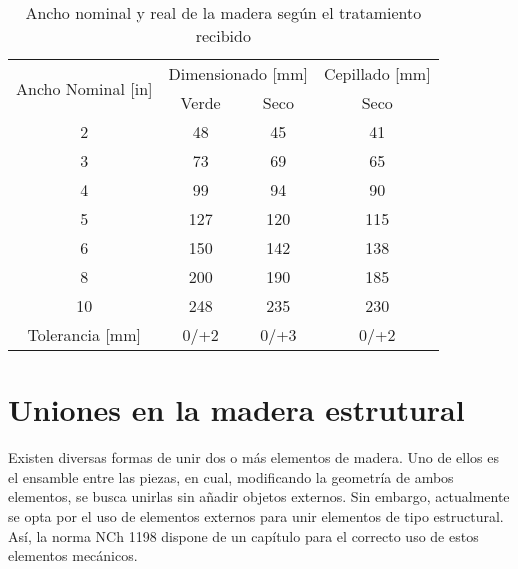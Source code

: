 \begin{table}[H]
\centering
\begin{tabular}{@{}cccc@{}}
\toprule
\multirow{2}{*}{Ancho Nominal {[}in{]}} & \multicolumn{2}{c}{Dimensionado {[}mm{]}} & Cepillado {[}mm{]} \\ \cmidrule(l){2-4} 
                                        & Verde                & Seco               & Seco               \\ \midrule
2                                       & 48                   & 45                 & 41                 \\
3                                       & 73                   & 69                 & 65                 \\
4                                       & 99                   & 94                 & 90                 \\
5                                       & 127                  & 120                & 115                \\
6                                       & 150                  & 142                & 138                \\
8                                       & 200                  & 190                & 185                \\
10                                      & 248                  & 235                & 230                \\ \midrule
Tolerancia {[}mm{]}                     & 0/+2                 & 0/+3               & 0/+2               \\ \bottomrule
\end{tabular}
\caption{Ancho nominal y real de la madera según el tratamiento recibido}
\label{tab:anchodim}
\end{table}

\section{Uniones en la madera estrutural}
Existen diversas formas de unir dos o más elementos de madera. Uno de ellos es el ensamble entre las piezas, en cual, modificando la geometría de ambos elementos, se busca unirlas sin añadir objetos externos. Sin embargo, actualmente se opta por el uso de elementos externos para unir elementos de tipo estructural. Así, la norma NCh 1198 dispone de un capítulo para el correcto uso de estos elementos mecánicos.
